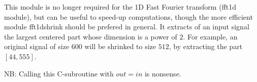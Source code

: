 This module is no longer required for the 1D Fast Fourier transform 
({\sf fft1d} module), but can be useful to speed-up computations, though
the more efficient module {\sf fft1dshrink} should be prefered in general.
It extracts of an input signal the largest centered part whose dimension 
is a power of $2$.
For example, an original signal of size $600$ will be shrinked to 
size $512$, by extracting the part $[44,555]$.

\vskip 0.5cm

NB: Calling this C-subroutine with $out=in$ is nonsense.
